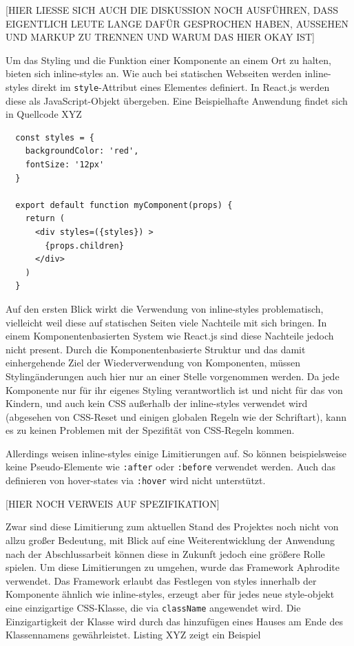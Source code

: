 [HIER LIESSE SICH AUCH DIE DISKUSSION NOCH AUSFÜHREN, DASS EIGENTLICH LEUTE LANGE DAFÜR GESPROCHEN HABEN, AUSSEHEN UND MARKUP ZU TRENNEN UND WARUM DAS HIER OKAY IST]

Um das Styling und die Funktion einer Komponente an einem Ort zu halten, bieten sich inline-styles an. Wie auch bei statischen Webseiten werden inline-styles direkt im \verb|style|-Attribut eines Elementes definiert. In React.js werden diese als JavaScript-Objekt übergeben. Eine Beispielhafte Anwendung findet sich in Quellcode XYZ

\begin{lstlisting}
  const styles = {
    backgroundColor: 'red',
    fontSize: '12px'
  }

  export default function myComponent(props) {
    return (
      <div styles=({styles}) >
  		{props.children}
  	  </div>
    )
  }
\end{lstlisting}

Auf den ersten Blick wirkt die Verwendung von inline-styles problematisch, vielleicht weil diese auf statischen Seiten viele Nachteile mit sich bringen. In einem Komponentenbasierten System wie React.js sind diese Nachteile jedoch nicht present. Durch die Komponentenbasierte Struktur und das damit einhergehende Ziel der Wiederverwendung von Komponenten, müssen Stylingänderungen auch hier nur an einer Stelle vorgenommen werden. Da jede Komponente nur für ihr eigenes Styling verantwortlich ist und nicht für das von Kindern, und auch kein CSS außerhalb der inline-styles verwendet wird (abgesehen von CSS-Reset und einigen globalen Regeln wie der Schriftart), kann es zu keinen Problemen mit der Spezifität von CSS-Regeln kommen.

Allerdings weisen inline-styles einige Limitierungen auf. So können beispielsweise keine Pseudo-Elemente wie \verb|:after| oder \verb|:before| verwendet werden. Auch das definieren von hover-states via \verb|:hover| wird nicht unterstützt.

[HIER NOCH VERWEIS AUF SPEZIFIKATION]

Zwar sind diese Limitierung zum aktuellen Stand des Projektes noch nicht von allzu großer Bedeutung, mit Blick auf eine Weiterentwicklung der Anwendung nach der Abschlussarbeit können diese in Zukunft jedoch eine größere Rolle spielen.
Um diese  Limitierungen zu umgehen, wurde das Framework Aphrodite verwendet. Das Framework erlaubt das Festlegen von styles innerhalb der Komponente ähnlich wie inline-styles, erzeugt aber für jedes neue style-objekt eine einzigartige CSS-Klasse, die via \verb|className| angewendet wird. Die Einzigartigkeit der Klasse wird durch das hinzufügen eines Hauses am Ende des Klassennamens gewährleistet.  Listing XYZ zeigt ein Beispiel

